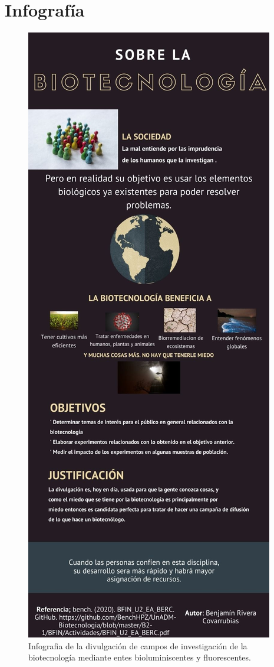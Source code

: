 \documentclass[12pt]{article}
\newcommand{\tema}[0]{divulgación de campos de investigación de la biotecnología mediante entes bioluminiscentes y fluorescentes}
\begin{document}
\section{Infografía}
	\begin{figure}[h]
		\centering
			\includegraphics[height=0.7\textheight]{infografia_biotecnologia.jpg}
		\caption{Infografia de la \tema.}
		\label{fig: }
	\end{figure}
\end{document}
